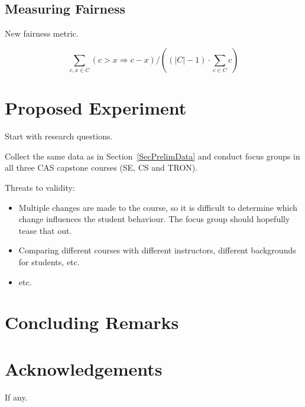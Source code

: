 \documentclass[10pt, conference]{IEEEtran}
\begin{document}
\subsection{Measuring Fairness}

New fairness metric.

$$
{ \sum\limits_{c, x \in C} (c > x \Rightarrow  {c-x})} / {((\left|C\right| -
1) \cdot \sum\limits_{c \in C} c)}
$$

\section{Proposed Experiment} \label{SecProposedExperiment}

Start with research questions.

Collect the same data as in Section~\ref{SecPrelimData} and conduct focus groups
in all three CAS capstone courses (SE, CS and TRON).  

Threats to validity:

\begin{itemize}
    \item Multiple changes are made to the course, so it is difficult to
    determine which change influences the student behaviour.  The focus group
    should hopefully tease that out.
    \item Comparing different courses with different instructors, different
    backgrounds for students, etc.
    \item etc.
\end{itemize}

\section{Concluding Remarks} \label{SecConclusions}

\section*{Acknowledgements}

If any.



\end{document}
